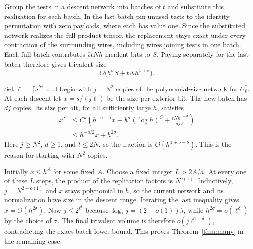 Group the tests in a descent network into batches of \(t\) and
substitute this realization for each batch. In the last batch pin
unused tests to the identity permutation with zero payloads, where
each has value one. Since the substituted network realizes the full
product tensor, the replacement stays exact under every contraction
of the surrounding wires, including wires joining tests in one batch.
Each full batch contributes \(3tNh\) incident bits to \(S\).
Paying separately for the last batch therefore gives trivalent size
\[
                     O\bigl(h^\sigma S+tNh^{1+\sigma}\bigr).
\]

Set \(\ell=\lceil h^b\rceil\) and begin with \(j=N^2\) copies of
the polynomial-size network for \(U_\ell^*\). At each descent let
\(x=s/(j\ell)\) be the size per exterior bit. The new batch has \(dj\)
copies. Its size per bit, for all sufficiently large \(h\), satisfies
\[
 \begin{split}
 x'&\le C'\left(h^{-a+\sigma}x+
        h^\sigma(\log h)^C+\frac{tNh^{1+\sigma}}{dj\ell}\right)\\
   &\le h^{-a/2}x+h^{2\sigma}.
 \end{split}
\]
Here \(j\ge N^2\), \(d\ge1\), and \(t\le 2N\), so the fraction is
\(O(h^{1+\sigma-b})\). This is the reason for starting with \(N^2\)
copies.

Initially \(x\le h^A\) for some fixed \(A\). Choose a fixed integer
\(L>2A/a\). At every one of these \(L\) steps, the product of the
replication factors is \(N^{o(1)}\). Inductively, \(j=N^{2+o(1)}\)
and \(x\) stays polynomial in \(h\), so the current network and its
normalization have size in the descent range. Iterating the last
inequality gives \(x=O(h^{2\sigma})\). Now \(j\le 2^{\ell^\xi}\)
because \(\log_2 j=(2+o(1))h\), while
\(h^{2\sigma}=o(\ell^\delta)\) by the choice of \(\sigma\).
The final trivalent volume is therefore \(o(j\ell^{1+\delta})\),
contradicting the exact batch lower bound. This proves
Theorem~\ref{thm:many} in the remaining case.
